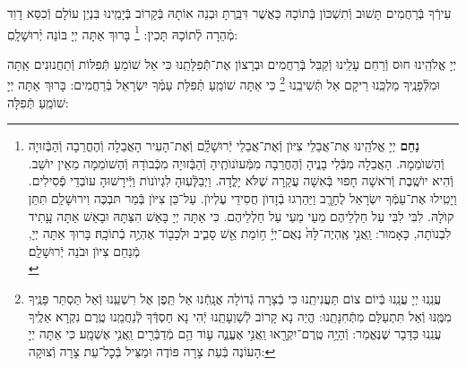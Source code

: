 \documentclass[twoside, openany, parskip=half, 11pt]{book}
\begin{document}
עִירְֿךָ בְּֿרַחֲמִים תָּשׁוּב וְֿתִשְׁכּוֹן בְּֿתוֹכָהּ כַּאֲשֶׁר דִּבַּֽרְתָּ וּבְנֵה אוֹתָהּ בְּֿקָרוֹב בְּֿיָמֵֽינוּ בִּנְיַן עוֹלָם וְֿכִסֵּא דָוִד מְֿהֵרָה לְֿתוֹכָהּ תָּכִין:
\footnote{
\textbf{נַחֵם}
יְיָ אֱלֹהֵֽינוּ אֶת־אֲבֵלֵי צִיּוֺן וְֿאֶת־אֲבֵלֵי יְֿרוּשָׁלַֽ֔֗͏ִם וְֿאֶת־הָעִיר הָאֲבֵלָה וְֿהֶחֳרֵבָה וְֿהַבְּֿזוּיָה וְֿהַשׁוֺמֵמָה. הָאֲבֵלָה מִבְּֿלִי בָנֱיהָ וְֿהֶחֳרֵבָה מִמְּֿעוֺנוֺתֶֽיהָ וְֿהַבְּֿזוּיָה מִכְּֿבוֺדָהּ וְֿהַשׁוֺמֵמָה מֵאֵין יוֺשֵׁב. וְֿהִיא יוֺשֶֽׁבֶת וְֿרֹאשָׁה חָפוּי בְּֿאִשָׁה עֲקַרָה שֶׁלֹּא יָלֳדָה. וַיְבַלְְּֿעֽוּהָ לִגְיוֺנוֺת וַיְּֿירָשׁוּהָ עוֺבְדֵי פְֿסִילִים. וַיָטִֽילוּ אֶת־עַמְּֿךָ יִשְׂרָאֵל לֶחָרֱֽב וַיַּהַרְגוּ בְֿזָדוֺן חֲסִידֵי עֶלְיוֺן. עַל־כֵּן צִיּוֺן בְּֿמַר תּבְכֶּה וִירוּשָׁלַֽ͏ִם תִּתֵּן קוֺלָהּ. לִבִּי לִבִּי עַל חַלְלֵיהֶם מֵעַי מֵעַי עַל חַלְלֵיהֶם. כִּי אַתָּה יְיָ בָּאֵשׁ הִצַּתָּהּ וּבָאֵשׁ אַתָּה עָָתִיד לִבְנוֺתָה, כָּאָמוּר: וַֽאֲנִ֤י אֶֽהְיֶה־לָּהּ֙ נְאֻם־יְיָ֔ ח֥וֹמַת אֵ֖שׁ סָבִ֑יב וּלְכָב֖וֹד אֶהְיֶ֥ה בְֿתוֹכָֽהּ׃
בָּרוּךְ אַתָּה יְיָ, מְֿנַחֵם צִיוֺן וּבֹנֵה יְֿרוּשָׁלַֽ͏ִם׃ \\
}
בָּרוּךְ אַתָּה יְיָ בּוֹנֵה יְֿרוּשָׁלָֽםִ:

\weekdaysamalchus

יְיָ אֱלֹהֵֽינוּ חוּס וְֿרַחֵם עָלֵֽינוּ וְֿקַבֵּל בְּֿרַחֲמִים וּבְרָצוֹן אֶת־תְּֿֿפִלָּתֵֽנוּ כִּי אֵל שׁוֹמֵעַ תְּֿפִלּוֹת וְֿתַחֲנוּנִים אַֽתָּה וּמִלְּֿפָנֶֽיךָ מַלְכֵּֽנוּ רֵיקָם אַל תְּֿשִׁיבֵֽנוּ
\footnote{
עֲנֵֽנוּ יְיָ עֲנֵֽנוּ בְּֿיוֹם צוֹם תַּעֲנִיתֵֽנוּ כִּי בְֿצָרָה גְֿדוֹלָה אֲנָֽחְֿנוּ אַל תֵּֽפֶן אֶל רִשְׁעֵֽנוּ וְֿאַל תַּסְתֵּר פָּנֶֽיךָ מִמֶּֽנּוּ וְֿאַל תִּתְעַלַּם מִתְּֿחִנָּתֵֽנוּ: הֱיֵה נָא קָרוֹב לְֿשַׁוְעָתֵֽנוּ יְֿהִי נָא חַסְדְּֿךָ לְֿנַחֲמֵֽנוּ טֶֽרֶם נִקְרָא אֵלֶֽיךָ עֲנֵֽנוּ כַּדָּבָר שֶׁנֶּאֱמַר:
וְֿהָיָ֥ה טֶֽרֶם־יִקְרָ֖אוּ וַֽאֲנִ֣י אֶעֱנֶ֑ה ע֛וֹד הֵ֥ם מְֿדַבְּֿרִ֖ים וַֽאֲנִ֥י אֶשְׁמָֽע׃ כִּי אַתָּה יְיָ הָעוֹנֶה בְּֿעֵת צָרָה פּוֹדֶה וּמַצִּיל בְּֿכׇל־עֵת צָרָה וְֿצוּקָה:
}
כִּי אַתָּה שׁוֹמֵֽעַ תְּֿפִלַּת עַמְּֿךָ יִשְׂרָאֵל בְּֿרַחֲמִים: בָּרוּךְ אַתָּה יְיָ שׁוֹמֵֽעַ תְּֿפִלָּה:

\retzeh

\yaalehveyavo

\zion

\modim

\clearpage

\alhanisim

\weekdaysahodos
\end{document}
